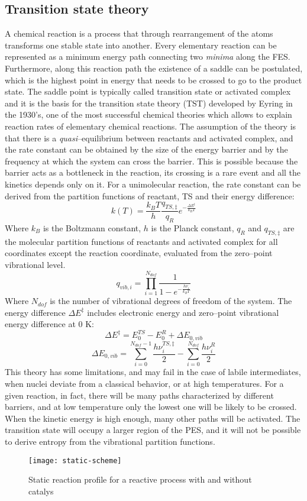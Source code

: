 \subsection*{Transition state theory}
A chemical reaction is a process that through rearrangement of the atoms transforms one stable state into another. Every elementary reaction can be represented as a minimum energy path connecting two \textit{minima} along the FES. Furthermore, along this reaction path the existence of a saddle can be postulated, which is the highest point in energy that needs to be crossed to go to the product state. 
The saddle point is typically called transition state or activated complex and it is the basis for the transition state theory (TST) developed by Eyring in the 1930’s, one of the most successful chemical theories which allows to explain reaction rates of elementary chemical reactions. The assumption of the theory is that there is a \textit{quasi}--equilibrium between reactants and activated complex, and the rate constant can be obtained by the size of the energy barrier and by the frequency at which the system can cross the barrier. This is possible because the barrier acts as a bottleneck in the reaction, its crossing is a rare event and all the kinetics depends only on it. For a unimolecular reaction, the rate constant can be derived from the partition functions of reactant, TS and their energy difference:
\[
k(T) = \dfrac{{k_B T}}{h}
\dfrac{{q_{TS,\ddagger}}}{{q_R}} e^{- \frac{\Delta E^{\ddagger}}{k_B T}}
\]
Where $k_B$ is the Boltzmann constant, $h$ is the Planck constant, $q_R$ and $q_{TS,\ddagger}$ are the molecular partition functions of reactants and activated complex for all coordinates except the reaction coordinate, evaluated from the zero--point vibrational level. 
\[
q_{vib,i} = \prod_{i=1}^{N_{dof}} \dfrac{1}{1 - e^{- \frac{h \nu_{i}}{k_B T}}}
\]
Where $N_{dof}$ is the number of vibrational degrees of freedom of the system. The energy difference $\Delta E^{\ddagger}$ includes electronic energy and zero--point vibrational energy difference at 0 K:
\[
\Delta E^{\ddagger} = E_{0}^{TS} - E_{0}^{R} + \Delta E_{0,vib}
\]
\[
\Delta E_{0,vib} = \sum_{i=0}^{N_{dof}-1} \frac{h \nu_{i}^{TS,\ddagger}}{2}
- \sum_{i=0}^{N_{dof}} \frac{h \nu_{i}^{R}}{2}
\]
This theory has some limitations, and may fail in the case of labile intermediates, when nuclei deviate from a classical behavior, or at high temperatures. For a given reaction, in fact, there will be many paths characterized by different barriers, and at low temperature only the lowest one will be likely to be crossed. When the kinetic energy is high enough, many other paths will be activated. The transition state will occupy a larger region of the PES, and it will not be possible to derive entropy from the vibrational partition functions.
\begin{figure}[!htbp]
	\centering
 	\texttt{[image: static-scheme]}
	\caption{Static reaction profile for a reactive process with and without catalys }
	\label{fig:static-scheme}
\end{figure}

